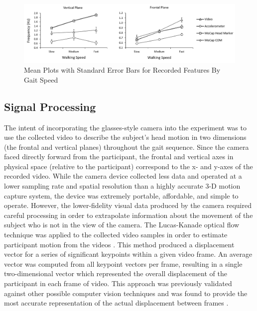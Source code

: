 \documentclass[12pt]{report}
\begin{document}
\begin{figure}
\centering
\includegraphics[width=6.5in]{figure/meanplots}
\caption{Mean Plots with Standard Error Bars for Recorded Features By Gait Speed}
\label{fig_meanPlots}
\end{figure}

\subsection{Signal Processing}
The intent of incorporating the glasses-style camera into the experiment was to use the collected video to describe the subject's head motion in two dimensions (the frontal and vertical planes) throughout the gait sequence. Since the camera faced directly forward from the participant, the frontal and vertical axes in physical space (relative to the participant) correspond to the x- and y-axes of the recorded video. While the camera device collected less data and operated at a lower sampling rate and spatial resolution than a highly accurate 3-D motion capture system, the device was extremely portable, affordable, and simple to operate. However, the lower-fidelity visual data produced by the camera required careful processing in order to extrapolate information about the movement of the subject who is not in the view of the camera. The Lucas-Kanade optical flow technique was applied to the collected video samples in order to estimate participant motion from the videos \cite{Lucas1981AnVision}. This method produced a displacement vector for a series of significant keypoints within a given video frame. An average vector was computed from all keypoint vectors per frame, resulting in a single two-dimensional vector which represented the overall displacement of the participant in each frame of video. This approach was previously validated against other possible computer vision techniques and was found to provide the most accurate representation of the actual displacement between frames \cite{Schneider2017PreliminaryProcessing}.
\end{document}
